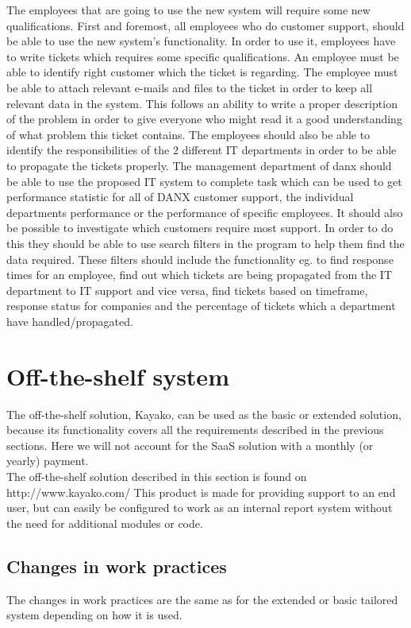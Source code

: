 The employees that are going to use the new system will require some new qualifications. First and foremost, all employees who do customer support, should be able to use the new system's functionality. In order to use it, employees have to write tickets which requires some specific qualifications. An employee must be able to identify right customer which the ticket is regarding. The employee must be able to attach relevant e-mails and files to the ticket in order to keep all relevant data in the system. This follows an ability to write a proper description of the problem in order to give everyone who might read it a good understanding of what problem this ticket contains. The employees should also be able to identify the responsibilities of the 2 different IT departments in order to be able to propagate the tickets properly.
The management department of danx should be able to use the proposed IT system to complete task which can be used to get performance statistic for all of DANX customer support, the individual departments performance or the performance of specific employees. It should also be possible to investigate which customers require most support.
In order to do this they should be able to use search filters in the program to help them find the data required. These filters should include the functionality eg. to find response times for an employee, find out which tickets are being propagated from the IT department to IT support and vice versa, find tickets based on timeframe, response status for companies and the percentage of tickets which a department have handled/propagated.

\section{Off-the-shelf system}
The off-the-shelf solution, Kayako\cite{webpage005}, can be used as the basic or extended solution, because its functionality covers all the requirements described in the previous sections.
Here we will not account for the SaaS solution with a monthly (or yearly) payment.\\	

The off-the-shelf solution described in this section is found on http://www.kayako.com/
This product is made for providing support to an end user, but can easily be configured to work as an internal report system without the need for additional modules or code.

\subsection{Changes in work practices}
The changes in work practices are the same as for the extended or basic tailored system depending on how it is used.

